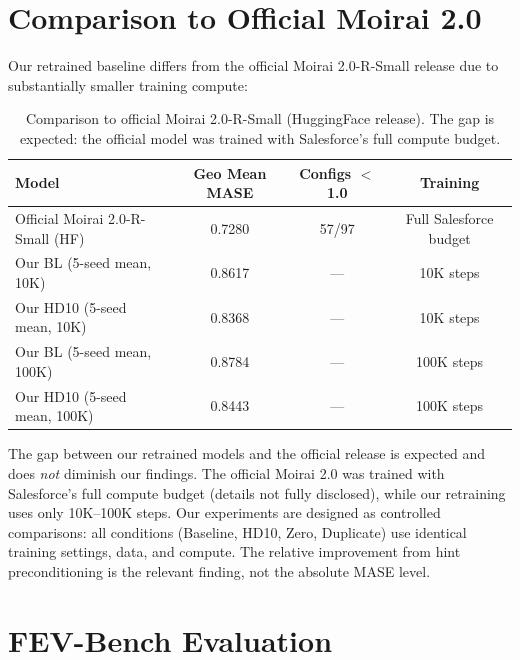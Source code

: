 \documentclass{article}
\begin{document}
\section{Comparison to Official Moirai 2.0}
\label{app:official}

Our retrained baseline differs from the official Moirai 2.0-R-Small release due to substantially smaller training compute:

\begin{table}[h]
\centering
\caption{Comparison to official Moirai 2.0-R-Small (HuggingFace release). The gap is expected: the official model was trained with Salesforce's full compute budget.}
\small
\begin{tabular}{lccc}
\toprule
\textbf{Model} & \textbf{Geo Mean MASE} & \textbf{Configs $<$ 1.0} & \textbf{Training} \\
\midrule
Official Moirai 2.0-R-Small (HF) & 0.7280 & 57/97 & Full Salesforce budget \\
Our BL (5-seed mean, 10K) & 0.8617 & --- & 10K steps \\
Our HD10 (5-seed mean, 10K) & 0.8368 & --- & 10K steps \\
Our BL (5-seed mean, 100K) & 0.8784 & --- & 100K steps \\
Our HD10 (5-seed mean, 100K) & 0.8443 & --- & 100K steps \\
\bottomrule
\end{tabular}
\end{table}

The gap between our retrained models and the official release is expected and does \emph{not} diminish our findings. The official Moirai 2.0 was trained with Salesforce's full compute budget (details not fully disclosed), while our retraining uses only 10K--100K steps. Our experiments are designed as controlled comparisons: all conditions (Baseline, HD10, Zero, Duplicate) use identical training settings, data, and compute. The relative improvement from hint preconditioning is the relevant finding, not the absolute MASE level.

\section{FEV-Bench Evaluation}
\label{app:fevbench}
\end{document}
